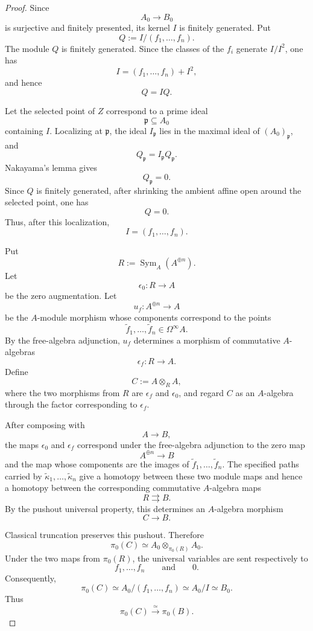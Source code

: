 \begin{proof}
Since
\[
    A_0
    \longrightarrow
    B_0
\]
is surjective and finitely presented, its kernel \(I\) is finitely
generated. Put
\[
    Q
    :=
    I/(f_1,\ldots,f_n).
\]
The module \(Q\) is finitely generated. Since the classes of the \(f_i\)
generate \(I/I^2\), one has
\[
    I
    =
    (f_1,\ldots,f_n)+I^2,
\]
and hence
\[
    Q
    =
    IQ.
\]

Let the selected point of \(Z\) correspond to a prime ideal
\[
    \mathfrak p
    \subseteq
    A_0
\]
containing \(I\). Localizing at \(\mathfrak p\), the ideal
\(I_{\mathfrak p}\) lies in the maximal ideal of
\((A_0)_{\mathfrak p}\), and
\[
    Q_{\mathfrak p}
    =
    I_{\mathfrak p}Q_{\mathfrak p}.
\]
Nakayama's lemma gives
\[
    Q_{\mathfrak p}
    =
    0.
\]
Since \(Q\) is finitely generated, after shrinking the ambient affine
open around the selected point, one has
\[
    Q
    =
    0.
\]
Thus, after this localization,
\[
    I
    =
    (f_1,\ldots,f_n).
\]

Put
\[
    R
    :=
    \operatorname{Sym}_A(A^{\oplus n}).
\]
Let
\[
    \epsilon_0
    \colon
    R
    \longrightarrow
    A
\]
be the zero augmentation. Let
\[
    u_f
    \colon
    A^{\oplus n}
    \longrightarrow
    A
\]
be the \(A\)-module morphism whose components correspond to the points
\[
    \widetilde f_1,\ldots,\widetilde f_n
    \in
    \Omega^\infty A.
\]
By the free-algebra adjunction, \(u_f\) determines a morphism of
commutative \(A\)-algebras
\[
    \epsilon_f
    \colon
    R
    \longrightarrow
    A.
\]
Define
\[
    C
    :=
    A\otimes_RA,
\]
where the two morphisms from \(R\) are \(\epsilon_f\) and
\(\epsilon_0\), and regard \(C\) as an \(A\)-algebra through the factor
corresponding to \(\epsilon_f\).

After composing with
\[
    A
    \longrightarrow
    B,
\]
the maps \(\epsilon_0\) and \(\epsilon_f\) correspond under the
free-algebra adjunction to the zero map
\[
    A^{\oplus n}
    \longrightarrow
    B
\]
and the map whose components are the images of
\(\widetilde f_1,\ldots,\widetilde f_n\). The specified paths carried by
\(\widetilde\kappa_1,\ldots,\widetilde\kappa_n\) give a homotopy between
these two module maps and hence a homotopy between the corresponding
commutative \(A\)-algebra maps
\[
    R
    \rightrightarrows
    B.
\]
By the pushout universal property, this determines an \(A\)-algebra
morphism
\[
    C
    \longrightarrow
    B.
\]

Classical truncation preserves this pushout. Therefore
\[
    \pi_0(C)
    \simeq
    A_0
    \otimes_{\pi_0(R)}
    A_0.
\]
Under the two maps from \(\pi_0(R)\), the universal variables are sent
respectively to
\[
    f_1,\ldots,f_n
    \qquad\text{and}\qquad
    0.
\]
Consequently,
\[
    \pi_0(C)
    \simeq
    A_0/(f_1,\ldots,f_n)
    \simeq
    A_0/I
    \simeq
    B_0.
\]
Thus
\[
    \pi_0(C)
    \xrightarrow{\simeq}
    \pi_0(B).
\]


\end{proof}
